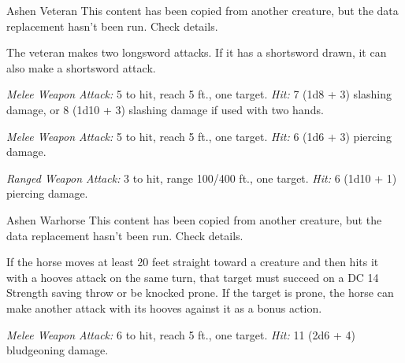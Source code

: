\documentclass[10pt,a4paper,twoside,bg=print,twocolumn,openany,nodeprecatedcode]{dndbook}
\begin{document}
\begin{DndMonster}[float=t]{Ashen Veteran}
\DndMonsterBasics[
armor-class = {17 (\textit{splint armor})},
hit-points = {\DndDice{9d8 + 18}},
speed = {30 ft.}
]
\DndMonsterAbilityScores[
 str = 16,
 dex = 13,
 con = 14,
 int = 10,
 wis = 11,
 cha = 10
]
\DndMonsterDetails[
skills = {Athletics +5, Perception +2},
languages = {any one language (usually Common)},
challenge = 3,
]
This content has been copied from another creature, but the data replacement hasn't been run. Check details.

The veteran makes two longsword attacks. If it has a shortsword drawn, it can also make a shortsword attack.

\textsl{Melee Weapon Attack:} 5 to hit, reach 5 ft., one target. \textsl{Hit:} 7 (1d8 + 3) slashing damage, or 8 (1d10 + 3) slashing damage if used with two hands.

\textsl{Melee Weapon Attack:} 5 to hit, reach 5 ft., one target. \textsl{Hit:} 6 (1d6 + 3) piercing damage.

\textsl{Ranged Weapon Attack:} 3 to hit, range 100/400 ft., one target. \textsl{Hit:} 6 (1d10 + 1) piercing damage.

\end{DndMonster}



\begin{DndMonster}[float=t]{Ashen Warhorse}
\DndMonsterBasics[
armor-class = {11},
hit-points = {\DndDice{3d10 + 3}},
speed = {60 ft.}
]
\DndMonsterAbilityScores[
 str = 18,
 dex = 12,
 con = 13,
 int = 2,
 wis = 12,
 cha = 7
]
\DndMonsterDetails[
challenge = 1/2,
]
This content has been copied from another creature, but the data replacement hasn't been run. Check details.

If the horse moves at least 20 feet straight toward a creature and then hits it with a hooves attack on the same turn, that target must succeed on a DC 14 Strength saving throw or be knocked prone. If the target is prone, the horse can make another attack with its hooves against it as a bonus action.

\textsl{Melee Weapon Attack:} 6 to hit, reach 5 ft., one target. \textsl{Hit:} 11 (2d6 + 4) bludgeoning damage.

\end{DndMonster}
\end{document}
